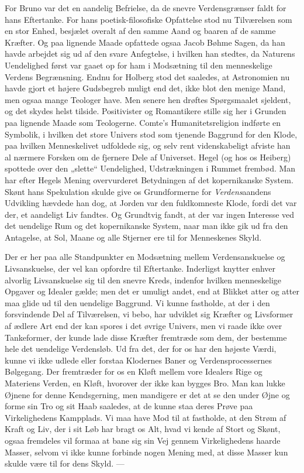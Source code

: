 \documentclass[12pt,a4paper]{article}
\newcommand{\opage}[1]{\marginnote{\footnotesize\textit{[#1]}}}
\begin{document}
For Bruno var det en aandelig Befrielse, da de snevre Verdensgrænser faldt
for hans Eftertanke. For hans poetisk-filosofiske Opfattelse stod nu
Tilværelsen som en stor Enhed, besjælet overalt af den samme Aand og baaren
af de samme Kræfter. Og paa lignende Maade opfattede ogsaa Jacob Bøhme
Sagen, da han havde arbejdet sig ud af den svare Anfegtelse, i hvilken han
stedtes, da Naturens Uendelighed først var gaaet op for ham i Modsætning
til den menneskelige Verdens Begrænsning. Endnu for Holberg stod det
saaledes, at Astronomien nu havde gjort et højere Gudsbegreb muligt end
det, ikke blot den menige Mand, men ogsaa mange Teologer have. Men senere
hen drøftes Spørgsmaalet sjeldent, og det skydes helst tilside. Positivister
og Romantikere stille sig her i Grunden paa lignende Maade som Teologerne.
Comte's Humanitetsreligion indførte en Symbolik, i hvilken det store Univers
stod som \opage{12} tjenende Baggrund for den Klode, paa hvilken Menneskelivet
udfoldede sig, og selv rent videnskabeligt afviste han al nærmere Forsken om
de fjernere Dele af Universet. Hegel (og hos os Heiberg) spottede over den
„slette“ Uendelighed, Udstrækningen i Rummet frembød. Man har efter Hegels
Mening overvurderet Betydningen af det kopernikanske System. Skønt hans
Spekulation skulde give os Grundformerne for \emph{Verdens}aandens Udvikling
hævdede han dog, at Jorden var den fuldkomneste Klode, fordi det var der, et
aandeligt Liv fandtes. Og Grundtvig fandt, at der var ingen Interesse ved
det uendelige Rum og det kopernikanske System, naar man ikke gik ud fra den
Antagelse, at Sol, Maane og alle Stjerner ere til for Menneskenes Skyld.

Der er her paa alle Standpunkter en Modsætning mellem Verdensanskuelse og
Livsanskuelse, der vel kan opfordre til Eftertanke. Inderligst knytter
enhver alvorlig Livsanskuelse sig til den snevre Kreds, indenfor hvilken
menneskelige Opgaver og Idealer gælde; men det er umuligt andet, end at
Blikket atter og atter maa glide ud til den uendelige Baggrund. Vi kunne
fastholde, at der i den forsvindende Del af Tilværelsen, vi bebo, har
udviklet sig Kræfter og Livsformer af ædlere Art end der kan spores i det
øvrige Univers, men vi raade ikke over Tankeformer, der kunde lade disse
Kræfter fremtræde som dem, der bestemme hele det uendelige Verdensløb. Ud
fra det, der for os har den højeste Værdi, kunne vi ikke udlede eller
forstaa Klodernes Baner og Verdensprocessernes Bølgegang. Der fremtræder
for os en Kløft mellem vore Idealers Rige og Materiens Verden, en Kløft,
hvorover der ikke kan bygges Bro. Man kan lukke Øjnene for denne
Kendsgerning, men mandigere er det at se den under Øjne og forme sin Tro og
sit Haab saaledes, at de kunne staa deres Prøve paa Virkelighedens
Kampplads. Vi maa have Mod til at fastholde, at den Strøm af Kraft og Liv,
der i sit Løb har \opage{13} bragt os Alt, hvad vi kende af Stort og Skønt, ogsaa
fremdeles vil formaa at bane sig sin Vej gennem Virkelighedens haarde
Masser, selvom vi ikke kunne forbinde nogen Mening med, at disse Masser kun
skulde være til for dens Skyld. ---
\end{document}
